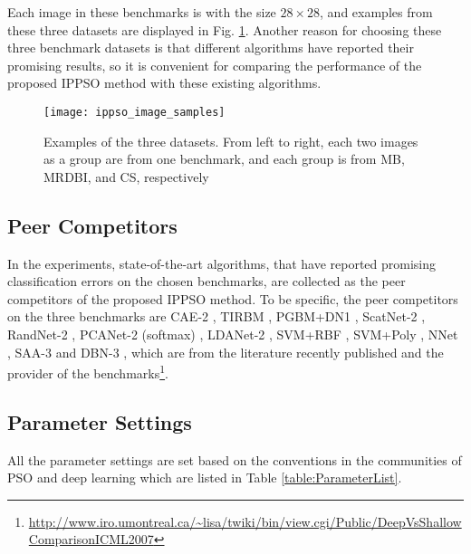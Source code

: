 \documentclass[conference]{IEEEtran}
\begin{document}
Each image in these benchmarks is with the size $28 \times 28$, and examples from these three datasets are displayed in Fig. \ref{fig:images}. Another reason for choosing these three benchmark datasets is that different algorithms have reported their promising results, so it is convenient for comparing the performance of the proposed IPPSO method with these existing algorithms.

\begin{figure}[!t]
	\centering
	\texttt{[image: ippso\_image\_samples]}
	\caption{Examples of the three datasets. From left to right, each two images as a group are from one benchmark, and each group is from MB, MRDBI, and CS, respectively}
	\label{fig:images}
\end{figure}


\subsection{Peer Competitors}\label{secpeer-competitors}

In the experiments, state-of-the-art algorithms, that have reported promising classification errors on the chosen benchmarks, are collected as the peer competitors of the proposed IPPSO method. To be specific, the peer competitors on the three benchmarks are CAE-2 \cite{CAE:Rifai}, TIRBM \cite{TIRBM:Sohn}, PGBM+DN1 \cite{PGBMDN1:Sohn}, ScatNet-2 \cite{ScatteringCNN:Bruna}, RandNet-2 \cite{DLBaseline:Chan}, PCANet-2 (softmax) \cite{DLBaseline:Chan}, LDANet-2 \cite{DLBaseline:Chan}, SVM+RBF \cite{DeepArchitectureEval:Larochelle}, SVM+Poly \cite{DeepArchitectureEval:Larochelle}, NNet \cite{DeepArchitectureEval:Larochelle}, SAA-3 \cite{DeepArchitectureEval:Larochelle} and DBN-3 \cite{DeepArchitectureEval:Larochelle}, which are from the literature \cite{DLBaseline:Chan} recently published and the provider of the benchmarks\footnote{\url{http://www.iro.umontreal.ca/~lisa/twiki/bin/view.cgi/Public/DeepVsShallowComparisonICML2007}}.

\subsection{Parameter Settings}

All the parameter settings are set based on the conventions in the communities of PSO \cite{PSOEPSettings:Van} and deep learning \cite{DLGuide:Hinton} which are listed in Table \ref{table:ParameterList}.
\end{document}
